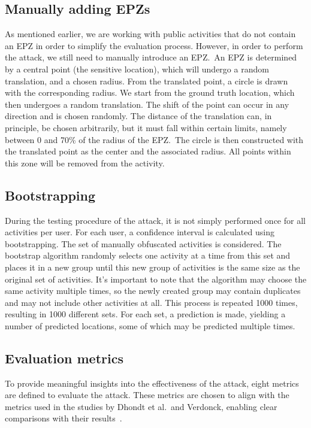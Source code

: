 \documentclass[conference]{IEEEtran}
\begin{document}
\subsection{Manually adding EPZs}
As mentioned earlier, we are working with public activities that do not contain
an EPZ in order to simplify the evaluation process. However, in order to
perform the attack, we still need to manually introduce an EPZ.\ An EPZ is
determined by a central point (the sensitive location), which will undergo a
random translation, and a chosen radius. From the translated point, a circle is
drawn with the corresponding radius. We start from the ground truth location,
which then undergoes a random translation. The shift of the point can occur in
any direction and is chosen randomly. The distance of the translation can, in
principle, be chosen arbitrarily, but it must fall within certain limits,
namely between 0 and 70\% of the radius of the EPZ.\ The circle is then
constructed with the translated point as the center and the associated radius.
All points within this zone will be removed from the activity.

\subsection{Bootstrapping}
During the testing procedure of the attack, it is not simply performed once for
all activities per user. For each user, a confidence interval is calculated
using bootstrapping. The set of manually obfuscated activities is considered.
The bootstrap algorithm randomly selects one activity at a time from this set
and places it in a new group until this new group of activities is the same
size as the original set of activities. It's important to note that the
algorithm may choose the same activity multiple times, so the newly created
group may contain duplicates and may not include other activities at all. This
process is repeated 1000 times, resulting in 1000 different sets. For each set,
a prediction is made, yielding a number of predicted locations, some of which
may be predicted multiple times.

\subsection{Evaluation metrics}
To provide meaningful insights into the effectiveness of the attack, eight
metrics are defined to evaluate the attack. These metrics are chosen to align
with the metrics used in the studies by Dhondt et al.\ and Verdonck, enabling
clear comparisons with their results~\cite{Dhondt, Verdonck_2022}.
\end{document}
